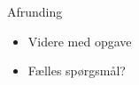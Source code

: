 \documentclass[a4paper,landscape]{slides}
\begin{document}
\begin{slide}
	\begin{center} {\large 
            Afrunding
	} \end{center}
	\begin{itemize} \addtolength{\itemsep}{-\baselineskip}
            \item Videre med opgave
            \item Fælles spørgsmål?
	\end{itemize}
\end{slide}
\end{document}
